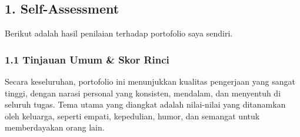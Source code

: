 \documentclass[
  letterpaper,
  DIV=11,
  numbers=noendperiod]{scrreprt}
\begin{document}
\subsection{1. Self-Assessment}\label{self-assessment}

Berikut adalah hasil penilaian terhadap portofolio saya sendiri.

\subsubsection{1.1 Tinjauan Umum \& Skor
Rinci}\label{tinjauan-umum-skor-rinci}

Secara keseluruhan, portofolio ini menunjukkan kualitas pengerjaan yang
sangat tinggi, dengan narasi personal yang konsisten, mendalam, dan
menyentuh di seluruh tugas. Tema utama yang diangkat adalah nilai-nilai
yang ditanamkan oleh keluarga, seperti empati, kepedulian, humor, dan
semangat untuk memberdayakan orang lain.
\end{document}

